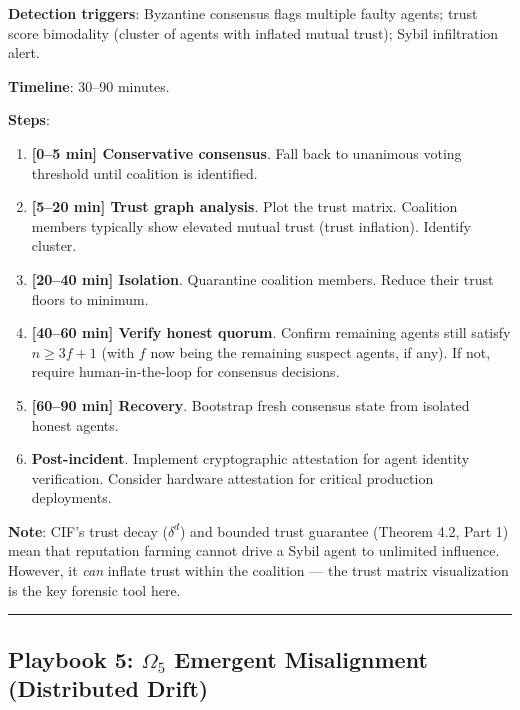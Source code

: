 \documentclass[
]{article}
\providecommand{\tightlist}{%
  \setlength{\itemsep}{0pt}\setlength{\parskip}{0pt}}
\begin{document}
\textbf{Detection triggers}: Byzantine consensus flags multiple faulty
agents; trust score bimodality (cluster of agents with inflated mutual
trust); Sybil infiltration alert.

\textbf{Timeline}: 30--90 minutes.

\textbf{Steps}:

\begin{enumerate}
\def\labelenumi{\arabic{enumi}.}
\tightlist
\item
  \textbf{{[}0--5 min{]} Conservative consensus}. Fall back to unanimous
  voting threshold until coalition is identified.
\item
  \textbf{{[}5--20 min{]} Trust graph analysis}. Plot the trust matrix.
  Coalition members typically show elevated mutual trust (trust
  inflation). Identify cluster.
\item
  \textbf{{[}20--40 min{]} Isolation}. Quarantine coalition members.
  Reduce their trust floors to minimum.
\item
  \textbf{{[}40--60 min{]} Verify honest quorum}. Confirm remaining
  agents still satisfy \(n \geq 3f+1\) (with \(f\) now being the
  remaining suspect agents, if any). If not, require human-in-the-loop
  for consensus decisions.
\item
  \textbf{{[}60--90 min{]} Recovery}. Bootstrap fresh consensus state
  from isolated honest agents.
\item
  \textbf{Post-incident}. Implement cryptographic attestation for agent
  identity verification. Consider hardware attestation for critical
  production deployments.
\end{enumerate}

\textbf{Note}: CIF's trust decay (\(\delta^d\)) and bounded trust
guarantee (Theorem 4.2, Part 1) mean that reputation farming cannot
drive a Sybil agent to unlimited influence. However, it \emph{can}
inflate trust within the coalition --- the trust matrix visualization is
the key forensic tool here.

\begin{center}\rule{0.5\linewidth}{0.5pt}\end{center}

\subsection{\texorpdfstring{Playbook 5: \(\Omega_5\) Emergent
Misalignment (Distributed
Drift)}{Playbook 5: Omega_5 Emergent Misalignment (Distributed Drift)}}\label{playbook-5-omega_5-emergent-misalignment-distributed-drift}
\end{document}
